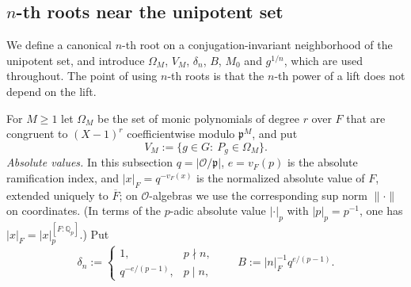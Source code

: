 \documentclass[12pt]{article}
\newcommand{\ov}[1]{\overline{#1}}
\newcommand{\cO}{\mathcal{O}}
\newcommand{\fp}{\mathfrak{p}}
\theoremstyle{plain}
\theoremstyle{definition}
\begin{document}
\subsection{$n$-th roots near the unipotent set}\label{subsec:roots}
We define a canonical $n$-th root on a conjugation-invariant neighborhood of the unipotent set, and introduce $\Omega_M$, $V_M$, $\delta_n$, $B$, $M_0$ and $g^{1/n}$, which are used throughout. The point of using $n$-th roots is that the $n$-th power of a lift does not depend on the lift.

For $M\ge1$ let $\Omega_M$ be the set of monic polynomials of degree $r$ over $F$ that are congruent to $(X-1)^r$ coefficientwise modulo $\fp^M$, and put
\[ V_M:=\{g\in G:\ P_g\in\Omega_M\}. \]
\emph{Absolute values.} In this subsection $q=|\cO/\fp|$, $e=v_F(p)$ is the absolute ramification index, and $|x|_F=q^{-v_F(x)}$ is the normalized absolute value of $F$, extended uniquely to $\ov F$; on $\cO$-algebras we use the corresponding sup norm $\|\cdot\|$ on coordinates. (In terms of the $p$-adic absolute value $|\cdot|_p$ with $|p|_p=p^{-1}$, one has $|x|_F=|x|_p^{[F:\mathbb Q_p]}$.) Put
\[ \delta_n:=\begin{cases}1,&p\nmid n,\\ q^{-e/(p-1)},&p\mid n,\end{cases}\qquad B:=|n|_F^{-1}q^{e/(p-1)}. \]
\end{document}
